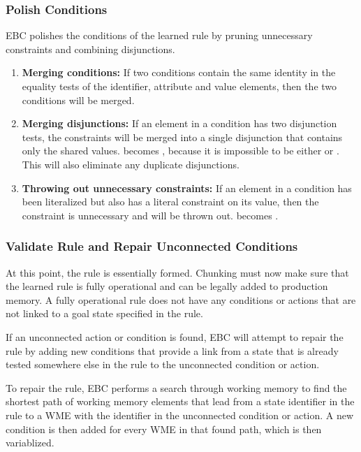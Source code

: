 \subsubsection{Polish Conditions}

EBC polishes the conditions of the learned rule by pruning unnecessary constraints and combining disjunctions.

\begin{enumerate}
	\item \textbf{Merging conditions:}
	If two conditions contain the same identity in the equality tests of the identifier, attribute and value elements, then the two conditions will be merged.

	\item \textbf{Merging disjunctions:} 
	If an element in a condition has two disjunction tests, the constraints will be merged into a single disjunction that contains only the shared values.  becomes , because it is impossible  to be either  or .  This will also eliminate any duplicate disjunctions.

	\item \textbf{Throwing out unnecessary constraints:} 
	If an element in a condition has been literalized but also has a literal constraint on its value, then the constraint is unnecessary and will be thrown out.   becomes .
\end{enumerate}

\subsubsection{Validate Rule and Repair Unconnected Conditions}

At this point, the rule is essentially formed.  Chunking must now make sure that the learned rule is fully operational and can be legally added to production memory.  A fully operational rule does not have any conditions or actions that are not linked to a goal state specified in the rule. 

If an unconnected action or condition is found, EBC will attempt to repair the rule by adding new conditions that provide a link from a state that is already tested somewhere else in the rule to the unconnected condition or action.

To repair the rule, EBC performs a search through working memory to find the shortest path of working memory elements that lead from a state identifier in the rule to a WME with the identifier in the unconnected condition or action.  A new condition is then added for every WME in that found path, which is then variablized.

